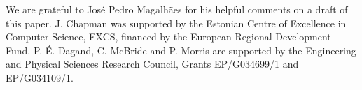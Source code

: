 \documentclass[authoryear]{sigplanconf}
\begin{document}





\acks

We are grateful to Jos\'{e} Pedro Magalh\~{a}es for his helpful comments on a
draft of this paper. 
J. Chapman was supported by the Estonian Centre of Excellence in
Computer Science, EXCS, financed by the European Regional Development
Fund. P.-\'{E}. Dagand, C. McBride and P. Morris are supported by the
Engineering and Physical Sciences Research Council, Grants EP/G034699/1 and 
EP/G034109/1.







\end{document}
